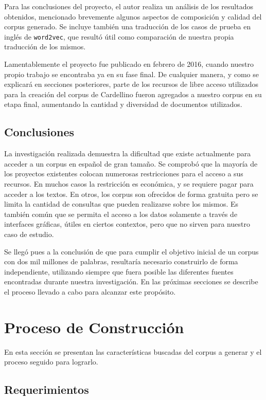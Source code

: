 Para las conclusiones del proyecto, el autor realiza un análisis de los resultados obtenidos, mencionado
brevemente algunos aspectos de composición y calidad del corpus generado. Se incluye también una
traducción de los casos de prueba en inglés de \texttt{word2vec}, que resultó útil como comparación de
nuestra propia traducción de los mismos.

Lamentablemente el proyecto fue publicado en febrero de 2016, cuando nuestro propio trabajo se
encontraba ya en su fase final. De cualquier manera, y como se explicará en secciones posteriores,
parte de los recursos de libre acceso utilizados para la creación del corpus de Cardellino fueron
agregados a nuestro corpus en su etapa final, aumentando la cantidad y diversidad de documentos
utilizados.

\subsection{Conclusiones}

La investigación realizada demuestra la dificultad que existe actualmente para acceder a un corpus en
español de gran tamaño. Se comprobó que la mayoría de los proyectos existentes colocan
numerosas restricciones para el acceso a sus recursos. En muchos casos la restricción es económica,
y se requiere pagar para acceder a los textos. En otros, los corpus son ofrecidos de forma gratuita pero
se limita la cantidad de consultas que pueden realizarse sobre los mismos. Es también común que se
permita el acceso a los datos solamente a través de interfaces gráficas, útiles en ciertos contextos, pero
que no sirven para nuestro caso de estudio.

Se llegó pues a la conclusión de que para cumplir el objetivo inicial de un corpus con dos mil millones
de palabras, resultaría necesario construirlo de forma independiente, utilizando siempre que fuera
posible las diferentes fuentes encontradas durante nuestra investigación. En las próximas secciones
se describe el proceso llevado a cabo para alcanzar este propósito.

\section{Proceso de Construcción}

En esta sección se presentan las características buscadas del corpus a generar y el proceso seguido
para lograrlo.

\subsection{Requerimientos}

